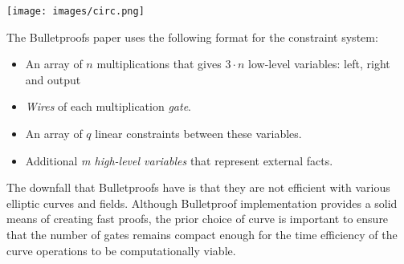 \documentclass{article}
\begin{document}
\begin{center}
\texttt{[image: images/circ.png]}
\end{center}
The Bulletproofs paper uses the following format for the constraint system: 
\begin{itemize}
    \item  An array of $n$ multiplications that gives $3 \cdot n$ low-level variables: left, right and output
    \item \emph{Wires} of each multiplication \emph{gate}.
    \item An array of $q$ linear constraints between these variables.
    \item Additional \emph{m high-level variables} that represent external facts.
\end{itemize} 
The downfall that Bulletproofs have is that they are not efficient with various elliptic curves and fields. Although Bulletproof implementation provides a solid means of creating fast proofs, the prior choice of curve is important to ensure that the number of gates remains compact enough for the time efficiency of the curve operations to be computationally viable.  
\end{document}
